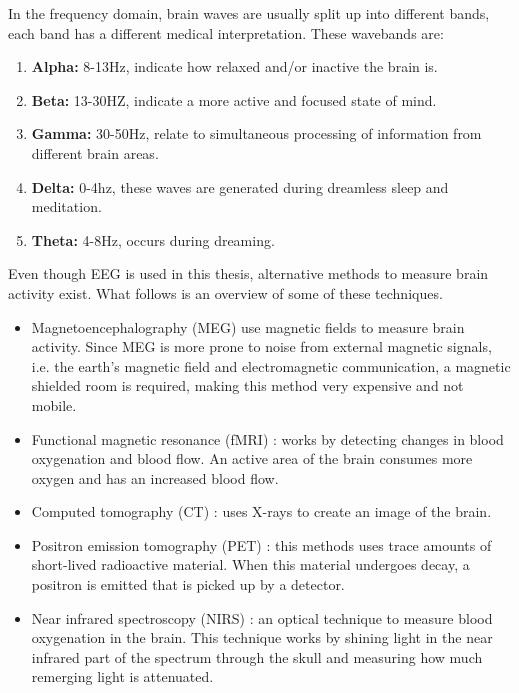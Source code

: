 
In the frequency domain, brain waves are usually split up into different bands\cite{EmotionRelativePower,WavesSite}, each band has a different medical interpretation. These wavebands \label{wavebands} are:
\begin{enumerate}
\item \textbf{Alpha:} 8-13Hz, indicate how relaxed and/or inactive the brain is.
\item \textbf{Beta:} 13-30HZ, indicate a more active and focused state of mind.
\item \textbf{Gamma:} 30-50Hz, relate to simultaneous processing of information from different brain areas.
\item \textbf{Delta:} 0-4hz, these waves are generated during dreamless sleep and meditation.
\item \textbf{Theta:} 4-8Hz, occurs during dreaming.
\end{enumerate}

\npar

Even though EEG is used in this thesis, alternative methods to measure brain activity exist. What follows is an overview of some of these techniques.
\begin{itemize}

\item Magnetoencephalography (MEG) use magnetic fields to measure brain activity\citep{meg}. Since MEG is more prone to noise from external magnetic signals, i.e. the earth's magnetic field and electromagnetic communication, a magnetic shielded room is required, making this method very expensive and not mobile.

\item Functional magnetic resonance (fMRI) \citep{fMRI}: works by detecting changes in blood oxygenation and blood flow. An active area of the brain consumes more oxygen and has an increased blood flow.

\item Computed tomography (CT) \citep{CT}: uses X-rays to create an image of the brain. 

\item Positron emission tomography (PET) \citep{PET}: this methods uses trace amounts of short-lived radioactive material. When this material undergoes decay, a positron is emitted that is picked up by a detector.

\item Near infrared spectroscopy (NIRS) \citep{NIRS}: an optical technique to measure blood oxygenation in the brain. This technique works by shining light in the near infrared part of the spectrum through the skull and measuring how much remerging light is attenuated.

\end{itemize} 

